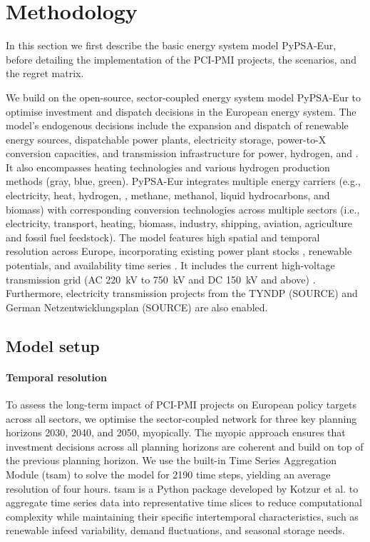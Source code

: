 \documentclass[preprint,12pt,sort&compress]{elsarticle}
\begin{document}
\section{Methodology}
\label{sec:methodology}
In this section we first describe the basic energy system model PyPSA-Eur, before detailing the implementation of the PCI-PMI projects, the scenarios, and the regret matrix.

We build on the open-source, sector-coupled energy system model PyPSA-Eur \cite{neumannPotentialRoleHydrogen2023,frysztackiComparisonClusteringMethods2022,glaumOffshorePowerHydrogen2024,horschPyPSAEurOpenOptimisation2018} to optimise investment and dispatch decisions in the European energy system. The model's endogenous decisions include the expansion and dispatch of renewable energy sources, dispatchable power plants, electricity storage, power-to-X conversion capacities, and transmission infrastructure for power, hydrogen, and . It also encompasses heating technologies and various hydrogen production methods (gray, blue, green).
PyPSA-Eur integrates multiple energy carriers (e.g., electricity, heat, hydrogen, , methane, methanol, liquid hydrocarbons, and biomass) with corresponding conversion technologies across multiple sectors (i.e., electricity, transport, heating, biomass, industry, shipping, aviation, agriculture and fossil fuel feedstock). The model features high spatial and temporal resolution across Europe, incorporating existing power plant stocks \cite{gotzensPerformingEnergyModelling2019}, renewable potentials, and availability time series \cite{hofmannAtliteLightweightPython2021}. It includes the current high-voltage transmission grid (AC \SI{220}{kV} to \SI{750}{kV} and DC \SI{150}{kV} and above) \cite{xiongModellingHighvoltageGrid2025}. Furthermore, electricity transmission projects from the TYNDP (SOURCE) and German Netzentwicklungsplan (SOURCE) are also enabled.

\subsection{Model setup}
\label{sec:model_setup}


\paragraph{Temporal resolution}
\label{sec:temporal_resolution}
To assess the long-term impact of PCI-PMI projects on European policy targets across all sectors, we optimise the sector-coupled network for three key planning horizons 2030, 2040, and 2050, myopically. The myopic approach ensures that investment decisions across all planning horizons are coherent and build on top of the previous planning horizon. We use the built-in Time Series Aggregation Module (tsam) to solve the model for 2190 time steps, yielding an average resolution of four hours. tsam is a Python package developed by Kotzur et al. \cite{kotzurImpactDifferentTime2018} to aggregate time series data into representative time slices to reduce computational complexity while maintaining their specific intertemporal characteristics, such as renewable infeed variability, demand fluctuations, and seasonal storage needs.
\end{document}
